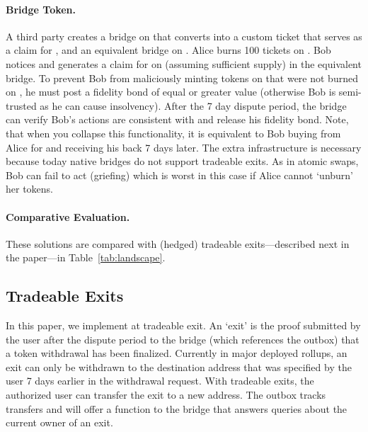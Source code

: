 \paragraph{Bridge Token.} A third party creates a bridge on \layertwo that converts \ethtwo into a custom ticket that serves as a claim for \ethtwo, and an equivalent bridge on \layerone. Alice burns 100 tickets on \layertwo. Bob notices and generates a claim for \ethone on \layerone (assuming sufficient supply) in the equivalent \layerone bridge. To prevent Bob from maliciously minting tokens on \layerone that were not burned on \layertwo, he must post a fidelity bond of equal or greater value (otherwise Bob is semi-trusted as he can cause insolvency). After the 7 day dispute period, the \layerone bridge can verify Bob's actions are consistent with \layertwo and release his fidelity bond. Note, that when you collapse this functionality, it is equivalent to Bob buying \ethxx from Alice for \ethone and receiving his \ethone back 7 days later. The extra infrastructure is necessary because today native bridges do not support tradeable exits. As in atomic swaps, Bob can fail to act (griefing) which is worst in this case if Alice cannot `unburn' her tokens.

\paragraph{Comparative Evaluation.} These solutions are compared with (hedged) tradeable exits---described next in the paper---in Table~\ref{tab:landscape}.
 

\subsection{Tradeable Exits} 
\label{sec:tradeablexits}



In this paper, we implement at tradeable exit. An `exit' is the proof submitted by the user after the dispute period to the bridge (which references the outbox) that a token withdrawal has been finalized. Currently in major deployed rollups, an exit can only be withdrawn to the destination address that was specified by the user 7 days earlier in the \layertwo withdrawal request. With tradeable exits, the authorized user can transfer the exit to a new address. The outbox tracks transfers and will offer a function to the bridge that answers queries about the current owner of an exit.

